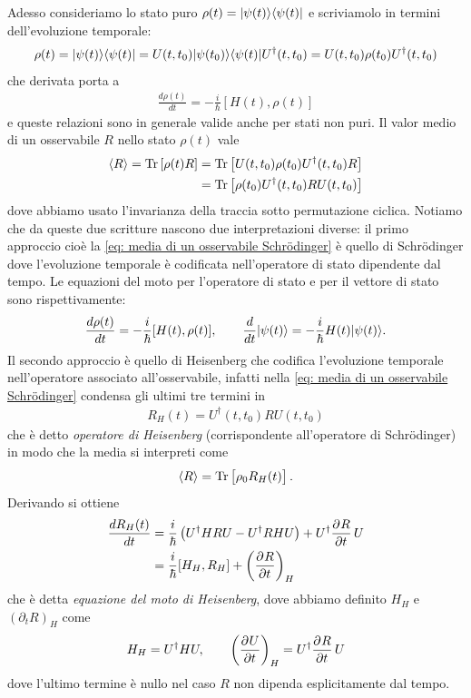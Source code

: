 Adesso consideriamo lo stato puro $ \rho(t) = \vert \psi(t) \rangle \langle \psi(t) \vert $ e scriviamolo in termini dell'evoluzione temporale:
\begin{align*}
  \rho(t) = \vert \psi(t) \rangle \langle \psi(t) \vert = U(t,t_0)\vert \psi(t_0) \rangle \langle \psi(t) \vert U^\dag(t,t_0) = U(t,t_0) \rho(t_0) U^\dag(t,t_0) 
\end{align*}
che derivata porta a 
\begin{align*}
  \frac{d\rho(t)}{dt} = -\frac{i}{\hbar} [H(t), \rho(t)]
\end{align*}
e queste relazioni sono in generale valide anche per stati non puri. Il valor medio di un osservabile $ R $ nello stato $ \rho(t) $ vale 
\begin{align}
  \langle R \rangle = \operatorname{\textnormal{Tr}} \left[ \rho(t) R \right] &= \operatorname{\textnormal{Tr}}\left[ U(t,t_0) \rho(t_0) U^\dag(t,t_0) R  \right] \label{eq: media di un osservabile Schrödinger}
  \\
  &= \operatorname{\textnormal{Tr}}\left[\rho(t_0) U^\dag(t,t_0) R U(t,t_0) \right] \label{eq: media di un osservabile Heisenberg}
\end{align}
dove abbiamo usato l'invarianza della traccia sotto permutazione ciclica. Notiamo che da queste due scritture nascono due interpretazioni diverse:
il primo approccio cioè la \eqref{eq: media di un osservabile Schrödinger} è quello di Schrödinger dove l'evoluzione temporale è codificata 
nell'operatore di stato dipendente dal tempo. Le equazioni del moto per l'operatore di stato e per il vettore di stato sono rispettivamente:
\begin{align*}
  \frac{d\rho(t)}{dt} = -\frac{i}{\hbar} [H(t), \rho(t)], \qquad \frac{d}{dt} \vert \psi(t) \rangle = - \frac{i}\hbar H(t) \vert \psi(t) \rangle.
\end{align*}
Il secondo approccio è quello di Heisenberg che codifica l'evoluzione temporale nell'operatore associato all'osservabile, infatti nella 
\eqref{eq: media di un osservabile Schrödinger} condensa gli ultimi tre termini in 
\begin{align*}
  R_H (t) = U^\dag(t,t_0) R U(t,t_0)
\end{align*}
che è detto \textit{operatore di Heisenberg} (corrispondente all'operatore di Schrödinger) in modo che la media si interpreti come 
\begin{align*}
  \langle R \rangle = \operatorname{\textnormal{Tr}}\left[ \vphantom{a^b}\rho_0 R_H(t) \right].
\end{align*}
Derivando si ottiene 
\begin{align*}
  \frac{d R_H(t)}{dt} &= \frac{i}\hbar \left( U^\dag H R U - U^\dag R H U \right) + U^\dag \frac{\partial^{} {R}}{\partial {t}^{}}\, U 
  \\
  &= \frac{i}\hbar [H_H, R_H] + \left( \frac{\partial^{} {R}}{\partial {t}^{}} \right)_H
\end{align*}
che è detta \textit{equazione del moto di Heisenberg}, dove abbiamo definito $ H_H $ e $ (\partial_t R)_H $ come 
\begin{align*}
  H_H = U^\dag H U,\qquad \left( \frac{\partial^{} {U}}{\partial {t}^{}} \right)_H =  U^\dag \frac{\partial^{} {R}}{\partial {t}^{}} \, U 
\end{align*}
dove l'ultimo termine è nullo nel caso $ R $ non dipenda esplicitamente dal tempo.

